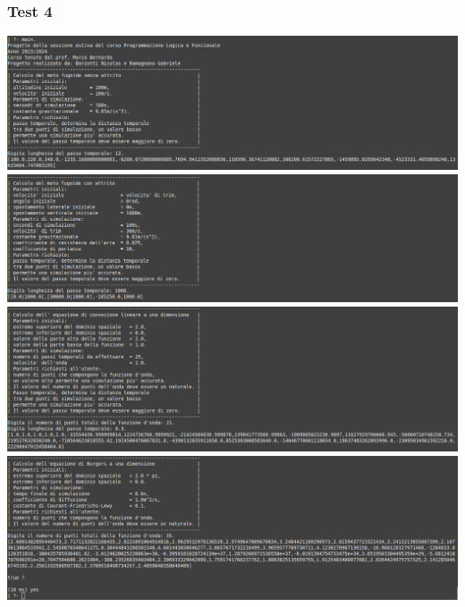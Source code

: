 \subsubsection*{Test 4}
\includegraphics[width=\textwidth,height=\textheight,keepaspectratio]{05_testing/image/pro/04_test/01.png}
\\
\includegraphics[width=\textwidth,height=\textheight,keepaspectratio]{05_testing/image/pro/04_test/02.png}
\\
\includegraphics[width=\textwidth,height=\textheight,keepaspectratio]{05_testing/image/pro/04_test/03.png}
\\
\includegraphics[width=\textwidth,height=\textheight,keepaspectratio]{05_testing/image/pro/04_test/04.png}

